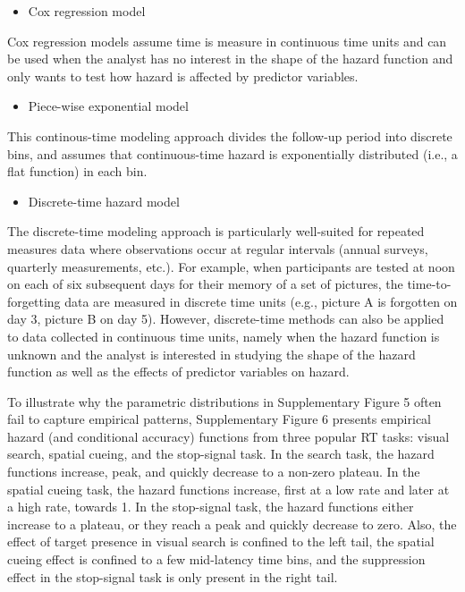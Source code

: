 \documentclass[
  english,
  man,floatsintext]{apa6}
\providecommand{\tightlist}{%
  \setlength{\itemsep}{0pt}\setlength{\parskip}{0pt}}
\begin{document}
\begin{itemize}
\tightlist
\item
  Cox regression model
\end{itemize}

Cox regression models assume time is measure in continuous time units and can be used when the analyst has no interest in the shape of the hazard function and only wants to test how hazard is affected by predictor variables.

\begin{itemize}
\tightlist
\item
  Piece-wise exponential model
\end{itemize}

This continous-time modeling approach divides the follow-up period into discrete bins, and assumes that continuous-time hazard is exponentially distributed (i.e., a flat function) in each bin.

\begin{itemize}
\tightlist
\item
  Discrete-time hazard model
\end{itemize}

The discrete-time modeling approach is particularly well-suited for repeated measures data where observations occur at regular intervals (annual surveys, quarterly measurements, etc.).
For example, when participants are tested at noon on each of six subsequent days for their memory of a set of pictures, the time-to-forgetting data are measured in discrete time units (e.g., picture A is forgotten on day 3, picture B on day 5).
However, discrete-time methods can also be applied to data collected in continuous time units, namely when the hazard function is unknown and the analyst is interested in studying the shape of the hazard function as well as the effects of predictor variables on hazard.

To illustrate why the parametric distributions in Supplementary Figure 5 often fail to capture empirical patterns, Supplementary Figure 6 presents empirical hazard (and conditional accuracy) functions from three popular RT tasks: visual search, spatial cueing, and the stop-signal task. In the search task, the hazard functions increase, peak, and quickly decrease to a non-zero plateau. In the spatial cueing task, the hazard functions increase, first at a low rate and later at a high rate, towards 1. In the stop-signal task, the hazard functions either increase to a plateau, or they reach a peak and quickly decrease to zero. Also, the effect of target presence in visual search is confined to the left tail, the spatial cueing effect is confined to a few mid-latency time bins, and the suppression effect in the stop-signal task is only present in the right tail.
\end{document}
